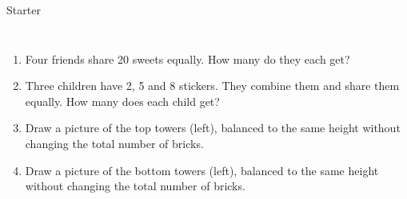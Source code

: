 \documentclass{beamer}
\newcommand{\ashow}[1]{\uncover<2->{\textcolor{red}{\small #1}}}
\newcommand{\ashowq}[1]{\alt<2->{\textcolor{red}{\small #1}}{?}}
\begin{document}
\begin{frame}{Starter}
\begin{columns}[T]
\footnotesize
\vspace{0.2em}
\begin{enumerate}\itemsep1pt
  \item Four friends share 20 sweets equally. How many do they each get? \ashow{5 sweets}
  \item Three children have 2, 5 and 8 stickers. They combine them and share them equally. How many does each child get? \ashow{5 stickers}
  \item Draw a picture of the top towers (left), balanced to the same height without changing the total number of bricks.
  \item Draw a picture of the bottom towers (left), balanced to the same height without changing the total number of bricks.
\end{enumerate}

\end{columns}
\end{frame}
\end{document}
